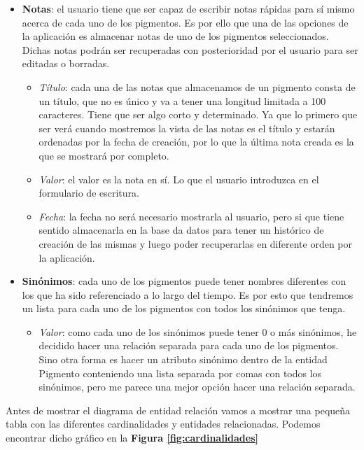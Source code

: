 \begin{itemize}
    \item \textbf{Notas}: el usuario tiene que ser capaz de escribir notas rápidas para sí mismo acerca de cada uno de los pigmentos. Es por ello que una de las opciones de la aplicación es almacenar notas de uno de los pigmentos seleccionados. Dichas notas podrán ser recuperadas con posterioridad por el usuario para ser editadas o borradas.
        \begin{itemize}
            \item \textit{Título}: cada una de las notas que almacenamos de un pigmento consta de un título, que no es único y va a tener una longitud limitada a 100 caracteres. Tiene que ser algo corto y determinado. Ya que lo primero que ser verá cuando mostremos la vista de las notas es el título y estarán ordenadas por la fecha de creación, por lo que la última nota creada es la que se mostrará por completo. 
            \item \textit{Valor}: el valor es la nota en sí. Lo que el usuario introduzca en el formulario de escritura. 
            \item \textit{Fecha}: la fecha no será necesario mostrarla al usuario, pero si que tiene sentido almacenarla en la base da datos para tener un histórico de creación de las mismas y luego poder recuperarlas en diferente orden por la aplicación.  
        \end{itemize}
        
    \item \textbf{Sinónimos}: cada uno de los pigmentos puede tener nombres diferentes con los que ha sido referenciado a lo largo del tiempo. Es por esto que tendremos un lista para cada uno de los pigmentos con todos los sinónimos que tenga. 
        \begin{itemize}
            \item \textit{Valor}: como cada uno de los sinónimos puede tener 0 o más sinónimos, he decidido hacer una relación separada para cada uno de los pigmentos. Sino otra forma es hacer un atributo sinónimo dentro de la entidad Pigmento conteniendo una lista separada por comas con todos los sinónimos, pero me parece una mejor opción hacer una relación separada. 
        \end{itemize}
\end{itemize}

Antes de mostrar el diagrama de entidad relación vamos a mostrar una pequeña tabla con las diferentes cardinalidades y entidades relacionadas. Podemos encontrar dicho gráfico en la \textbf{Figura \ref{fig:cardinalidades}}

